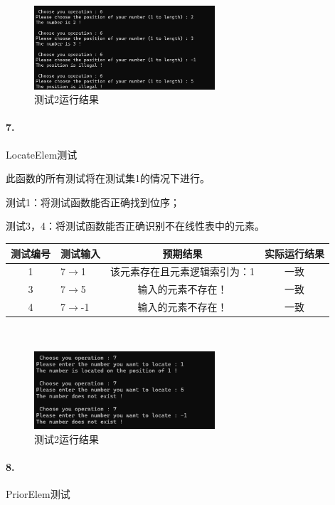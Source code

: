 \documentclass[supercite]{Experimental_Report}
\theoremstyle{definition}
\begin{document}
~\

 \begin{figure}[H]
 	\centering
 	\includegraphics[width=0.6\textwidth]{images/线性表测试6.png}
 	\caption{测试2运行结果}
 	\label{txlab}
 \end{figure}

\paragraph{ 7.}LocateElem测试

此函数的所有测试将在测试集1的情况下进行。

测试1：将测试函数能否正确找到位序；

测试3，4：将测试函数能否正确识别不在线性表中的元素。

\vspace{0.5em}

\begin{tabular}{|c|l|c|c|}
	\hline
	测试编号 & 测试输入 & 预期结果 & 实际运行结果 \\
	\hline
	1 & 7$\rightarrow$1 & 该元素存在且元素逻辑索引为：1 & 一致 \\
	\hline
	3 & 7$\rightarrow$5 & 输入的元素不存在！ & 一致 \\
	\hline
	4 & 7$\rightarrow$-1 & 输入的元素不存在！ & 一致 \\
	\hline
\end{tabular}

~\

 \begin{figure}[H]
 	\centering
 	\includegraphics[width=0.6\textwidth]{images/线性表测试7.png}
 	\caption{测试2运行结果}
 	\label{txlab}
 \end{figure}


\paragraph{ 8.}PriorElem测试
\end{document}
